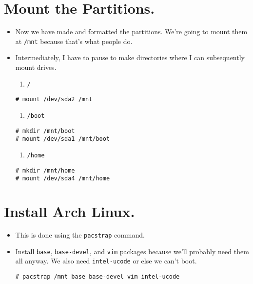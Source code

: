 \documentclass{article}
\begin{document}
\section{Mount the Partitions.}
\begin{itemize}
  \item Now we have made and formatted the partitions. We're going to mount them
    at \verb|/mnt| because that's what people do.
  \item Intermediately, I have to pause to make directories where I can
    subsequently mount drives.
  \begin{enumerate}
    \item \verb|/|
  \end{enumerate}
\begin{verbatim}
# mount /dev/sda2 /mnt
\end{verbatim}
  \begin{enumerate}
    \item \verb|/boot|
  \end{enumerate}
\begin{verbatim}
# mkdir /mnt/boot
# mount /dev/sda1 /mnt/boot
\end{verbatim}
  \begin{enumerate}
    \item \verb|/home|
  \end{enumerate}
\begin{verbatim}
# mkdir /mnt/home
# mount /dev/sda4 /mnt/home
\end{verbatim}
\end{itemize}

\section{Install Arch Linux.}
  \begin{itemize}
    \item This is done using the \verb|pacstrap| command.
    \item Install \verb|base|, \verb|base-devel|, and \verb|vim| packages
      because we'll probably need them all anyway. We also need
      \verb|intel-ucode| or else we can't boot.
\begin{verbatim}
# pacstrap /mnt base base-devel vim intel-ucode
\end{verbatim}
  \end{itemize}
\end{document}
